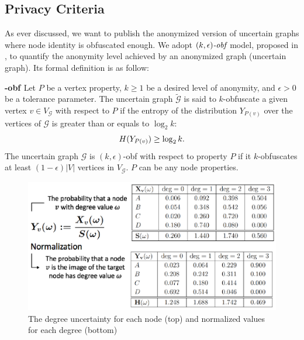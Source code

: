 {%
\subsection{Privacy Criteria}
As ever discussed, we want to publish the anonymized version of uncertain graphs where node identity is obfuscated enough. We adopt $\textit{$(k,\epsilon)$-obf}$ model, proposed in \cite{Bonchi_Identity_2014}, to quantify the anonymity level achieved by an anonymized graph (uncertain graph).
Its formal definition is as follow: 
\begin{definition}
    \textbf{-obf \cite{Bonchi_Identity_2014}}
    Let $P$ be a vertex property, $k \geq 1$ be a desired level of anonymity, and $\epsilon >0 $ be a tolerance parameter. The uncertain graph $\tilde{\mathcal{G}}$ is said to $k$-obfuscate a given vertex $v \in V_{\mathcal{G}}$ with respect to $P$ if the entropy of the distribution $Y_{P(v)}$ over the vertices of $\mathcal{G}$ is greater than or equals to $\log_{2}{k}$:
    \vj
    \begin{equation*}
        H(Y_{P(v)}) \geq \log_{2}{k}.
    \label{obfCon}
    \svj
    \end{equation*}
The uncertain graph $\mathcal{G}$ is $(k,\epsilon)$-obf with respect to property $P$ if it $k$-obfuscates at least $(1-\epsilon)|V|$ vertices in $V_{\mathcal{G}}$. $P$ can be any node properties.  
\end{definition}

\begin{figure}[t]
        \centering    
        \includegraphics[scale=0.8]{figures/DegreeAUG/entropyEx.eps}
        \caption{The degree uncertainty for each node (top) and normalized values for each degree (bottom)}
    \label{fig:entropyExample}
\end{figure}

}
